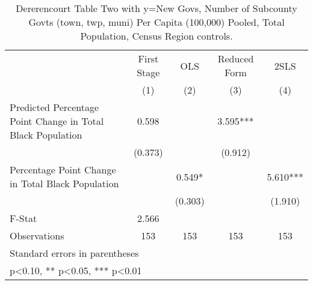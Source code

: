 \begin{table}[htbp]\centering
\def\sym#1{\ifmmode^{#1}\else\(^{#1}\)\fi}
\caption{Dererencourt Table Two with y=New Govs, Number of Subcounty Govts (town, twp, muni) Per Capita (100,000) Pooled, Total Population, Census Region controls.}
\begin{tabular}{l*{4}{c}}
\toprule
                    & First Stage   &         OLS   &Reduced Form   &        2SLS   \\
                    &\multicolumn{1}{c}{(1)}   &\multicolumn{1}{c}{(2)}   &\multicolumn{1}{c}{(3)}   &\multicolumn{1}{c}{(4)}   \\
\midrule
Predicted Percentage Point Change in Total Black Population&       0.598   &               &       3.595***&               \\
                    &     (0.373)   &               &     (0.912)   &               \\
\addlinespace
Percentage Point Change in Total Black Population&               &       0.549*  &               &       5.610***\\
                    &               &     (0.303)   &               &     (1.910)   \\
\midrule
F-Stat              &       2.566   &               &               &               \\
Observations        &         153   &         153   &         153   &         153   \\
\bottomrule
\multicolumn{5}{l}{\footnotesize Standard errors in parentheses}\\
\multicolumn{5}{l}{\footnotesize * p<0.10, ** p<0.05, *** p<0.01}\\
\end{tabular}
\end{table}
